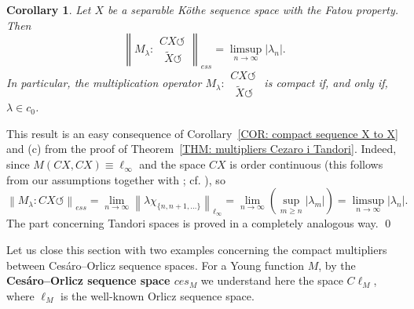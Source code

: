 \documentclass[11pt]{amsart}
\theoremstyle{definition}
\theoremstyle{definition}
\theoremstyle{definition}
\newtheorem{corollary}[theorem]{Corollary}
\theoremstyle{definition}
\theoremstyle{definition}
\theoremstyle{definition}
\theoremstyle{definition}
\theoremstyle{definition}
\numberwithin{equation}{section}
\numberwithin{equation}{section}
\numberwithin{equation}{section}
\theoremstyle{definition}
\theoremstyle{definition}
\theoremstyle{definition}
\theoremstyle{definition}
\theoremstyle{definition}
\theoremstyle{definition}
\newcommand{\norm}[1]{\left\lVert#1\right\rVert}
\newcommand{\abs}[1]{\left\lvert#1\right\rvert}
\renewenvironment{proof}{\noindent {\bf Proof.}}{\qed}
\begin{document}
\begin{corollary}
	{\it Let $X$ be a separable K{\" o}the sequence space with the Fatou property. Then}
	\begin{equation*}
		\norm{M_{\lambda} \colon \begin{array}{l} CX \circlearrowleft \\ \;\, \widetilde{X} \circlearrowleft \end{array}}_{ess}
			= \limsup\limits_{n \rightarrow \infty} \abs{\lambda_n}.
	\end{equation*}
	{\it In particular, the multiplication operator $M_{\lambda} \colon \begin{array}{l} CX \circlearrowleft \\ \;\, \widetilde{X} \circlearrowleft \end{array}$
		is compact if, and only if, $\lambda \in c_0$.}
\end{corollary}
\begin{proof}
	This result is an easy consequence of Corollary~\ref{COR: compact sequence X to X} and (c) from the proof of Theorem~\ref{THM: multipliers Cezaro i Tandori}.
	Indeed, since $M(CX,CX) \equiv \ell_{\infty}$ and the space $CX$ is order continuous (this follows from our assumptions together with \cite[Lemma~1]{LM16};
	cf. \cite[Proposition~5.1]{KKT22}), so
	\begin{equation*}
		\norm{M_{\lambda} \colon CX \circlearrowleft }_{ess}
			= \lim\limits_{n \rightarrow \infty} \norm{\lambda \chi_{\{n, n+1, ...\}}}_{\ell_{\infty}}
			= \lim\limits_{n \rightarrow \infty} \left( \sup\limits_{m \geqslant n} \abs{\lambda_m} \right)
			= \limsup\limits_{n \rightarrow \infty} \abs{\lambda_n}.
	\end{equation*}
	The part concerning Tandori spaces is proved in a completely analogous way.
\end{proof}

Let us close this section with two examples concerning the compact multipliers between Ces{\' a}ro--Orlicz sequence spaces.
For a Young function $M$, by the {\bf Ces{\' a}ro--Orlicz sequence space $ces_M$} we understand here the space $C\ell_M$,
where $\ell_M$ is the well-known Orlicz sequence space.
\end{document}
